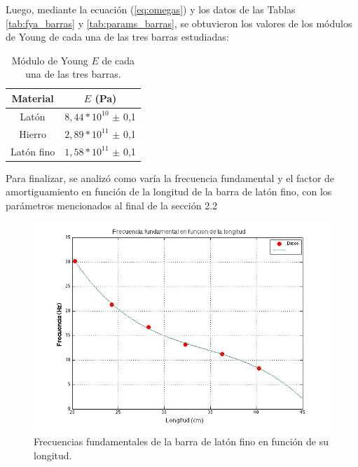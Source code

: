 \documentclass[twoside,twocolumn,a4paper]{article}
\begin{document}
Luego, mediante la ecuaci\'on (\ref{eq:omegas}) y los datos de las Tablas \ref{tab:fya_barras} y \ref{tab:params_barras}, se obtuvieron los valores de los m\'odulos de Young de cada una de las tres barras estudiadas:

\begin{table}[H]
\centering
\caption{M\'odulo de Young $E$ de cada una de las tres barras.}
\label{tab:young_barras}
\begin{tabular}{|c|c|}
\hline
Material & $E$ (Pa)\\ \hline
Lat\'on & $8,44 * 10^{10}$ $\pm$ 0,1\\ \hline
Hierro & $2,89 * 10^{11}$ $\pm$ 0,1\\ \hline
Lat\'on fino & $1,58 * 10^{11}$ $\pm$ 0,1\\ \hline
\end{tabular}
\end{table}

Para finalizar, se analiz\'o como var\'ia la frecuencia fundamental y el factor de amortiguamiento en funci\'on de la longitud de la barra de lat\'on fino, con los par\'ametros mencionados al final de  la secci\'on 2.2

\begin{figure}[H]
\includegraphics[width=\linewidth]{fvsl.jpg}
\caption{Frecuencias fundamentales de la barra de lat\'on fino en funci\'on de su longitud.}
\label{fig:fvsl}
\end{figure}
\end{document}
